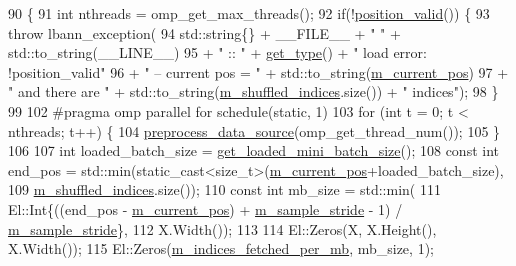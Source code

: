 \begin{DoxyCode}
90                                                 \{
91   \textcolor{keywordtype}{int} nthreads = omp\_get\_max\_threads();
92   \textcolor{keywordflow}{if}(!\hyperlink{classlbann_1_1generic__data__reader_a2b10538440d784f0f12582a5407acef2}{position\_valid}()) \{
93     \textcolor{keywordflow}{throw} lbann\_exception(
94       std::string\{\} + \_\_FILE\_\_ + \textcolor{stringliteral}{" "} + std::to\_string(\_\_LINE\_\_)
95       + \textcolor{stringliteral}{" :: "} + \hyperlink{classlbann_1_1data__reader__mnist__siamese_a2c5a29603f850bb0684dba1c64981604}{get\_type}() + \textcolor{stringliteral}{"  load error: !position\_valid"}
96       + \textcolor{stringliteral}{" -- current pos = "} + std::to\_string(\hyperlink{classlbann_1_1generic__data__reader_a2facf4e410099ac8c1fa586e797ec2e0}{m\_current\_pos})
97       + \textcolor{stringliteral}{" and there are "} + std::to\_string(\hyperlink{classlbann_1_1generic__data__reader_aaab6aeff67ffff1c689336851fec2c57}{m\_shuffled\_indices}.size()) + \textcolor{stringliteral}{" indices"});
98   \}
99 
102 \textcolor{preprocessor}{  #pragma omp parallel for schedule(static, 1)}
103   \textcolor{keywordflow}{for} (\textcolor{keywordtype}{int} t = 0; t < nthreads; t++) \{
104     \hyperlink{classlbann_1_1generic__data__reader_ad613f95666b973d8da77773fb34c9b66}{preprocess\_data\_source}(omp\_get\_thread\_num());
105   \}
106 
107   \textcolor{keywordtype}{int} loaded\_batch\_size = \hyperlink{classlbann_1_1generic__data__reader_a850e99110dd1e9df2985f09ea196fea8}{get\_loaded\_mini\_batch\_size}();
108   \textcolor{keyword}{const} \textcolor{keywordtype}{int} end\_pos = std::min(static\_cast<size\_t>(\hyperlink{classlbann_1_1generic__data__reader_a2facf4e410099ac8c1fa586e797ec2e0}{m\_current\_pos}+loaded\_batch\_size),
109                                \hyperlink{classlbann_1_1generic__data__reader_aaab6aeff67ffff1c689336851fec2c57}{m\_shuffled\_indices}.size());
110   \textcolor{keyword}{const} \textcolor{keywordtype}{int} mb\_size = std::min(
111     El::Int\{((end\_pos - \hyperlink{classlbann_1_1generic__data__reader_a2facf4e410099ac8c1fa586e797ec2e0}{m\_current\_pos}) + \hyperlink{classlbann_1_1generic__data__reader_a58461c39de7e17eafc5b98aec99cbb9b}{m\_sample\_stride} - 1) / 
      \hyperlink{classlbann_1_1generic__data__reader_a58461c39de7e17eafc5b98aec99cbb9b}{m\_sample\_stride}\},
112     X.Width());
113 
114   El::Zeros(X, X.Height(), X.Width());
115   El::Zeros(\hyperlink{classlbann_1_1generic__data__reader_a4ee1a159c74561c15a5e0c267ad3cc6a}{m\_indices\_fetched\_per\_mb}, mb\_size, 1);

\end{DoxyCode}
